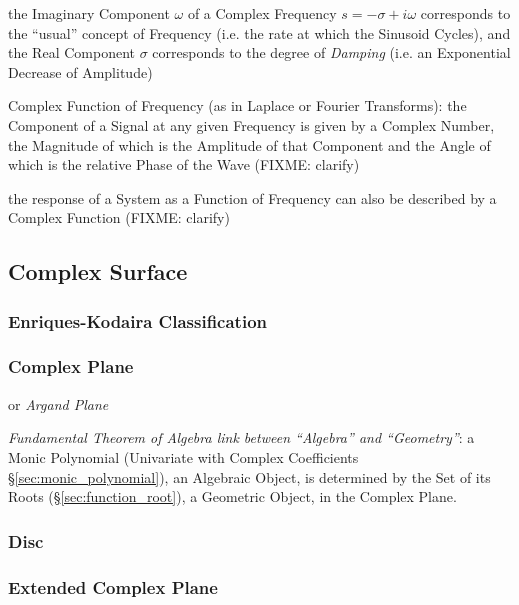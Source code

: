 the Imaginary Component $\omega$ of a Complex Frequency $s = -\sigma + i\omega$
corresponds to the ``usual'' concept of Frequency (i.e. the rate at which the
Sinusoid Cycles), and the Real Component $\sigma$ corresponds to the degree of
\emph{Damping} (i.e. an Exponential Decrease of Amplitude)

Complex Function of Frequency (as in Laplace or Fourier Transforms): the
Component of a Signal at any given Frequency is given by a Complex Number, the
Magnitude of which is the Amplitude of that Component and the Angle of which is
the relative Phase of the Wave (FIXME: clarify)

the response of a System as a Function of Frequency can also be described by a
Complex Function (FIXME: clarify)



\subsection{Complex Surface}\label{sec:complex_surface}

\subsubsection{Enriques-Kodaira Classification}
\label{sec:enriques_kodaira}

\subsubsection{Complex Plane}\label{sec:complex_plane}

or \emph{Argand Plane}

\emph{Fundamental Theorem of Algebra link between ``Algebra'' and
  ``Geometry''}: a Monic Polynomial (Univariate with Complex Coefficients
\S\ref{sec:monic_polynomial}), an Algebraic Object, is determined by the Set of
its Roots (\S\ref{sec:function_root}), a Geometric Object, in the Complex
Plane.



\subsubsection{Disc}\label{sec:disc}

\subsubsection{Extended Complex Plane}\label{sec:extended_complex_plane}

